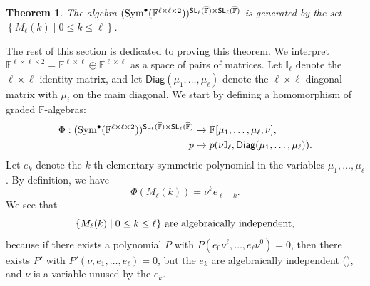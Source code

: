 \documentclass[a4paper]{extarticle}
\newcommand{\IF}{\mathbb{F}}
\newcommand{\oIF}{{\overline{\mathbb{F}}}}
\newcommand{\SL}{\textsf{\textup{SL}}}
\newcommand{\Sym}{\textup{Sym}}
\newcommand{\Diag}{\textsf{Diag}}
\newtheorem{theorem}{Theorem}
\numberwithin{theorem}{section}
\theoremstyle{definition}
\begin{document}
\begin{theorem} \label{thm:basis}
The algebra
$(\Sym^{\bullet}(\IF^{\ell\times\ell\times2}))^{\SL_\ell(\oIF)\times \SL_\ell(\oIF)}$
is generated by the set
$\left\{ M_\ell(k) \mid 0\leq k \leq \ell\right\}$.
\end{theorem}
The rest of this section is dedicated to proving this theorem.
We interpret $\IF^{\ell\times\ell\times 2}=\IF^{\ell\times\ell}\oplus\IF^{\ell\times\ell}$ as a space of pairs of matrices.
Let $\mathbb{I}_\ell$ denote the $\ell\times\ell$ identity matrix, and let $\Diag(\mu_1,\ldots,\mu_\ell)$ denote the $\ell\times\ell$ diagonal matrix with $\mu_i$ on the main diagonal.
We start by defining a homomorphism of graded $\IF$-algebras:
\begin{align*}
\Phi : (\Sym^{\bullet}(\IF^{\ell\times\ell\times2}))^{\SL_\ell(\oIF)\times \SL_\ell(\oIF)}
&\to \IF[\mu_1,\dots,\mu_\ell,\nu],
\\
p &\mapsto p(\nu \mathbb{I}_\ell,\Diag(\mu_1,\ldots,\mu_\ell)).
\end{align*}
Let $e_k$ denote the $k$-th elementary symmetric polynomial in the variables $\mu_1,\ldots,\mu_\ell$.
By definition, we have
\begin{equation}\label{eq:PhiMe}
\Phi(M_\ell(k)) = \nu^{k} e_{\ell-k}.
\end{equation}
We see that
\begin{equation}\label{eq:Mkalgindep}
\textup{$\{M_\ell(k)\mid 0\leq k\leq \ell\}$ are algebraically independent},
\end{equation}
because if
there exists a polynomial $P$ with $P(e_0 \nu^{\ell},\ldots,e_\ell \nu^{0})=0$, then there exists $P'$ with $P'(\nu,e_1,\ldots,e_\ell)=0$, but the $e_k$ are algebraically independent (\cite[Thm.~8.2]{Lan05}), and $\nu$ is a variable unused by the $e_k$.
\end{document}
